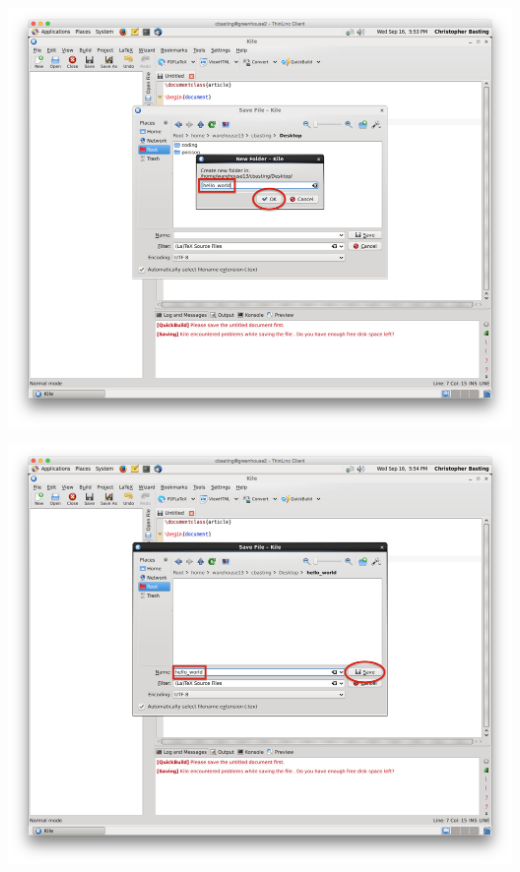 \begin{frame}
	\includegraphics[width=\textwidth]{screenshots/kile-new-save-as-create-folder.png}
\end{frame}

\begin{frame}
	\includegraphics[width=\textwidth]{screenshots/kile-new-save-as-2.png}
\end{frame}

